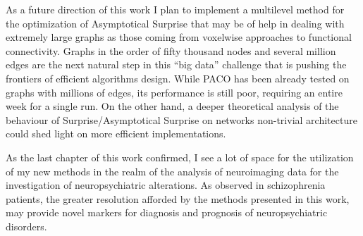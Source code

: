 As a future direction of this work I plan to implement a multilevel method for the optimization of Asymptotical Surprise that may be of help in dealing with extremely large graphs as those coming from voxelwise approaches to functional connectivity.
Graphs in the order of fifty thousand nodes and several million edges are the next natural step in this ``big data'' challenge that is pushing the frontiers of efficient algorithms design.
While PACO has been already tested on graphs with millions of edges, its performance is still poor, requiring an entire week for a single run.
On the other hand, a deeper theoretical analysis of the behaviour of Surprise/Asymptotical Surprise on networks non-trivial architecture could shed light on more efficient implementations.

As the last chapter of this work confirmed, I see a lot of space for the utilization of my new methods in the realm of the analysis of neuroimaging data for the investigation of neuropsychiatric alterations. As observed in schizophrenia patients, the greater resolution afforded by the methods presented in this work, may provide novel markers for diagnosis and prognosis of neuropsychiatric disorders.